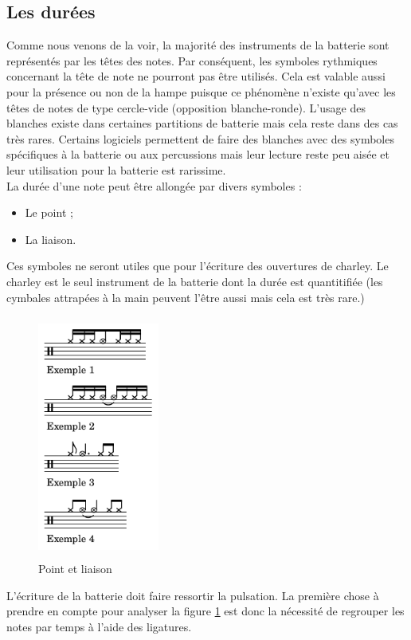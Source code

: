 \subsection*{Les durées}
\label{hho}
Comme nous venons de la voir, la majorité des instruments de la batterie sont représentés par les têtes des notes. Par conséquent, les symboles rythmiques concernant la tête de note ne pourront pas être utilisés. Cela est valable aussi pour la présence ou non de la hampe puisque ce phénomène n’existe qu’avec les têtes de notes de type cercle-vide (opposition blanche-ronde). L’usage des blanches existe dans certaines partitions de batterie \cite{system_drums} mais cela reste dans des cas très rares. Certains logiciels permettent de faire des blanches avec des symboles spécifiques à la batterie ou aux percussions mais leur lecture reste peu aisée et leur utilisation pour la batterie est rarissime.\\
La durée d’une note peut être allongée par divers symboles :
\begin{itemize}
	\item Le point ;
	\item La liaison.
\end{itemize}
Ces symboles ne seront utiles que pour l’écriture des ouvertures de charley. Le charley est le seul instrument de la batterie dont la durée est quantitifiée (les cymbales attrapées à la main peuvent l’être aussi mais cela est très rare.)\newpage
\begin{figure}[h]
	\centering
	\includegraphics[height=80mm, width=40mm]{z_images/3_methodes/0_notation_de_la_batterie/3_point_et_liaison.png}
	\caption{Point et liaison}
	\label{point_liaison}
\end{figure}
L’écriture de la batterie doit faire ressortir la pulsation. La première chose à prendre en compte pour analyser la figure \ref{point_liaison} est donc la nécessité de regrouper les notes par temps à l’aide des ligatures.\\
